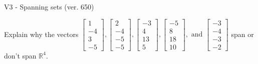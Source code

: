 \begin{exercise}
  \begin{exerciseTitle}V3 - Spanning sets (ver. 650)\end{exerciseTitle}
  \begin{exerciseStatement}
    Explain why the vectors \(\left[\begin{array}{r}
1 \\
-4 \\
3 \\
-5
\end{array}\right] , \left[\begin{array}{r}
2 \\
-4 \\
-5 \\
-5
\end{array}\right] , \left[\begin{array}{r}
-3 \\
4 \\
13 \\
5
\end{array}\right] , \left[\begin{array}{r}
-5 \\
8 \\
18 \\
10
\end{array}\right] , \text{ and } \left[\begin{array}{r}
-3 \\
-4 \\
-3 \\
-2
\end{array}\right]\) span or don't span \(\mathbb{R}^4\). 
	



\end{exerciseStatement}
\end{exercise}
